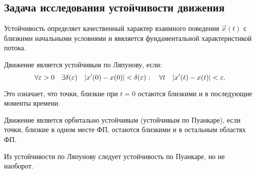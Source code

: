 \subsection{Задача исследования устойчивости движения}

Устойчивость определяет качественный характер взаимного поведения $\vec{x}(t)$ с близкими начальными условиями и явяляется фундаментальной характеристикой потока.

\begin{definition}
	Движение является устойчивым по Ляпунову, если:
	$$\forall \varepsilon>0 \quad \exists \delta(\varepsilon) \quad \lvert x^{\prime}(0)-x(0)\rvert<\delta(\varepsilon): \quad \forall t \quad  \lvert x^{\prime}(t)-x(t)\rvert<\varepsilon.$$
	
	Это означает, что точки, близкие при $t=0$ остаются близкими и в последующие моменты времени.
\end{definition}

\begin{definition}
	Движение является орбитально устойчивым (устойчивым по Пуанкаре), если точки, близкие в одном месте ФП, остаются близкими и в остальным областях ФП.
\end{definition}

\begin{remark}
	Из устойчивости по Ляпунову следует устойчивость по Пуанкаре, но не наоборот.
\end{remark}

